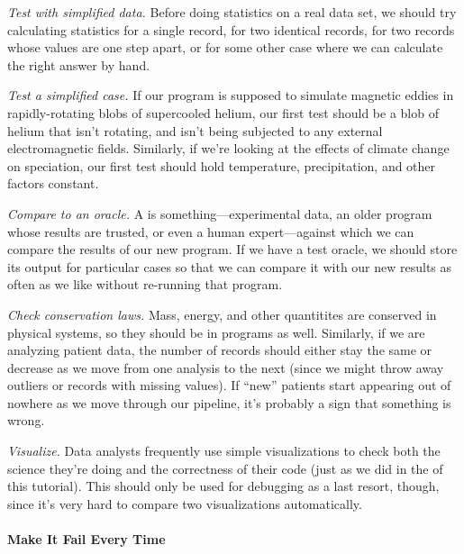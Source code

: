 \documentclass{book}
\begin{document}
\begin{swcenumerate}
\item
  \emph{Test with simplified data.} Before doing statistics on a real
  data set, we should try calculating statistics for a single record,
  for two identical records, for two records whose values are one step
  apart, or for some other case where we can calculate the right answer
  by hand.
\item
  \emph{Test a simplified case.} If our program is supposed to simulate
  magnetic eddies in rapidly-rotating blobs of supercooled helium, our
  first test should be a blob of helium that isn't rotating, and isn't
  being subjected to any external electromagnetic fields. Similarly, if
  we're looking at the effects of climate change on speciation, our
  first test should hold temperature, precipitation, and other factors
  constant.
\item
  \emph{Compare to an oracle.} A 
  is something---experimental data, an older program whose results are
  trusted, or even a human expert---against which we can compare the
  results of our new program. If we have a test oracle, we should store
  its output for particular cases so that we can compare it with our new
  results as often as we like without re-running that program.
\item
  \emph{Check conservation laws.} Mass, energy, and other quantitites
  are conserved in physical systems, so they should be in programs as
  well. Similarly, if we are analyzing patient data, the number of
  records should either stay the same or decrease as we move from one
  analysis to the next (since we might throw away outliers or records
  with missing values). If ``new'' patients start appearing out of
  nowhere as we move through our pipeline, it's probably a sign that
  something is wrong.
\item
  \emph{Visualize.} Data analysts frequently use simple visualizations
  to check both the science they're doing and the correctness of their
  code (just as we did in the  of
  this tutorial). This should only be used for debugging as a last
  resort, though, since it's very hard to compare two visualizations
  automatically.
\end{swcenumerate}

\mbox{}\paragraph{Make It Fail Every Time}
\end{document}
